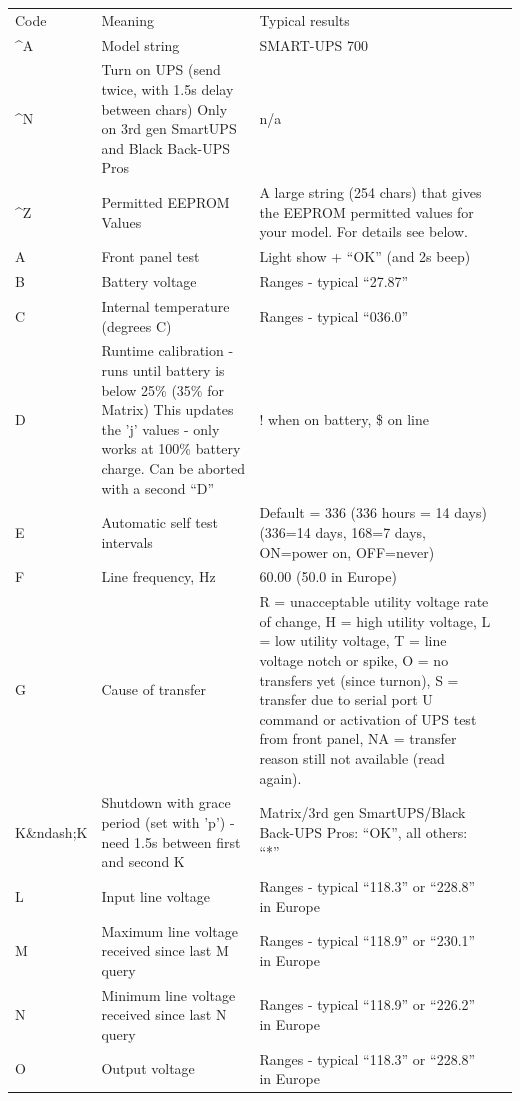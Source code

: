 \begin{longtable}{llll}
{Code} & {Meaning} & {Typical results} & { 
 } \\
{\^{}A} & {Model string} & {SMART-UPS 700} & { 
 } \\
{\^{}N} & {Turn on UPS (send twice, with \gt{} 1.5s delay between chars) Only
on 3rd gen SmartUPS and Black Back-UPS Pros} & {n/a} & { 
 } \\
{\^{}Z} & {Permitted EEPROM Values} & {A large string (254 chars) that gives
the EEPROM permitted values for your model. For details see below.} & { 
 } \\
{A} & {Front panel test} & {Light show + ``OK'' (and 2s beep)} & { 
 } \\
{B} & {Battery voltage} & {Ranges - typical ``27.87''} & { 
 } \\
{C} & {Internal temperature (degrees C)} & {Ranges - typical ``036.0''} & { 
 } \\
{D} & {Runtime calibration - runs until battery is below 25\% (35\% for
Matrix) This updates the 'j' values - only works at 100\% battery charge. Can
be aborted with a second ``D''} & {! when on battery, \$ on line} & { 
 } \\
{E} & {Automatic self test intervals} & {Default = 336 (336 hours = 14 days)
(336=14 days, 168=7 days, ON=power on, OFF=never)} & { 
 } \\
{F} & {Line frequency, Hz} & {60.00 (50.0 in Europe)} & { 
 } \\
{G} & {Cause of transfer} & {R = unacceptable utility voltage rate of change,
H = high utility voltage, L = low utility voltage, T = line voltage notch or
spike, O = no transfers yet (since turnon), S = transfer due to serial port U
command or activation of UPS test from front panel, NA = transfer reason still
not available (read again).} & { 
 } \\
{K\&ndash;K} & {Shutdown with grace period (set with 'p') - need \gt{} 1.5s
between first and second K} & {Matrix/3rd gen SmartUPS/Black Back-UPS Pros:
``OK'', all others: ``*''} & { 
 } \\
{L} & {Input line voltage} & {Ranges - typical ``118.3'' or ``228.8'' in
Europe} & { 
 } \\
{M} & {Maximum line voltage received since last M query} & {Ranges - typical
``118.9'' or ``230.1'' in Europe} & { 
 } \\
{N} & {Minimum line voltage received since last N query} & {Ranges - typical
``118.9'' or ``226.2'' in Europe} & { 
 } \\
{O} & {Output voltage} & {Ranges - typical ``118.3'' or ``228.8'' in Europe} &

\end{longtable}
